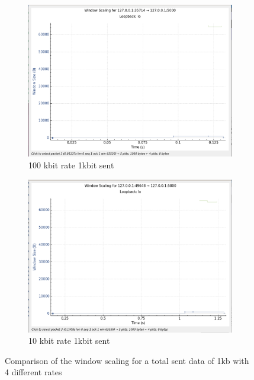 \documentclass{report}
\begin{document}
\begin{figure}[H]
    \begin{subfigure}[b]{0.45\textwidth}
        \centering
        \includegraphics[width=\textwidth]{Pics/Cubic/r100kbit_s1000_ws}
        \caption{100 kbit rate 1kbit sent}
    \end{subfigure}
    \hfill
    \begin{subfigure}[b]{0.45\textwidth}
        \centering
        \includegraphics[width=\textwidth]{Pics/Cubic/r10kbit_s1000_ws}
        \caption{10 kbit rate 1kbit sent}
    \end{subfigure}
    \caption{Comparison of the window scaling for a total sent data of 1kb with 4 different rates}
    \label{fig:four_images}
\end{figure}
\end{document}
